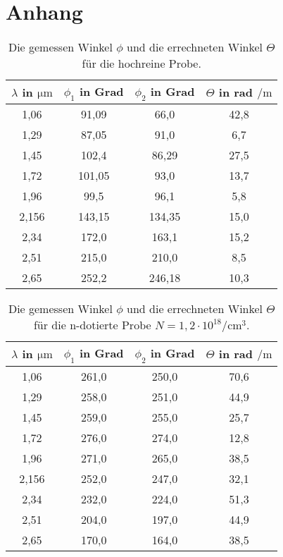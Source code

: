 \section{Anhang}
\label{sec:Anhang}

\begin{table}
    \centering
    \caption{Die gemessen Winkel $\phi$ und die errechneten Winkel $\Theta$ für die hochreine Probe.}
    \label{tab:bla}
    \begin{tabular}{c c c c}
        \toprule
        $\lambda$ in $\si{\um}$ & $\phi_1$ in Grad  & $\phi_2$ in Grad & $\Theta$ in rad $\si{\per\meter}$ \\
        \midrule
        1,06  &  91,09  &  66,0  &  42,8  \\
        1,29  &  87,05  &  91,0  &  6,7  \\
        1,45  &  102,4  &  86,29  &  27,5  \\
        1,72  &  101,05  &  93,0  &  13,7  \\
        1,96  &  99,5  &  96,1  &  5,8  \\
        2,156  &  143,15  &  134,35  &  15,0  \\
        2,34  &  172,0  &  163,1  &  15,2  \\
        2,51  &  215,0  &  210,0  &  8,5  \\
        2,65  &  252,2  &  246,18  &  10,3  \\       
        \bottomrule
    \end{tabular}
\end{table}

\begin{table}
    \centering
    \caption{Die gemessen Winkel $\phi$ und die errechneten Winkel $\Theta$ für die n-dotierte Probe $N = 1,2 \cdot 10^{18} \si{\per\cubic\cm}$.}
    \label{tab:bla}
    \begin{tabular}{c c c c}
        \toprule
        $\lambda$ in $\si{\um}$ & $\phi_1$ in Grad  & $\phi_2$ in Grad & $\Theta$ in rad $\si{\per\meter}$ \\
        \midrule
        1,06  &  261,0  &  250,0  &  70,6  \\
        1,29  &  258,0  &  251,0  &  44,9  \\
        1,45  &  259,0  &  255,0  &  25,7  \\
        1,72  &  276,0  &  274,0  &  12,8  \\
        1,96  &  271,0  &  265,0  &  38,5  \\
        2,156  &  252,0  &  247,0  &  32,1  \\
        2,34  &  232,0  &  224,0  &  51,3  \\
        2,51  &  204,0  &  197,0  &  44,9  \\
        2,65  &  170,0  &  164,0  &  38,5  \\
        \bottomrule
    \end{tabular}
\end{table}

